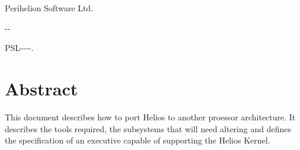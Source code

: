 


\docinfooperator{}
\docinfocomments{}

\markright{\thesubject}

\raggedbottom
\pagestyle{myheadings}



\begin{titlepage}

\begin{center}
\Huge
\thetitle
\vspace{1in}

{\bf\thesubject}
\vspace{1in}

\LARGE
\theauthor

Perihelion Software Ltd.

\theday-\themonth-\theyear

\normalsize
\vspace{2in}
PSL-\theproject-\theauthinit-\theyear-\thedocno.\theversion\\
\end{center}

\end{titlepage}

\pagestyle{plain}

\tableofcontents 
\vfill

\newpage
\section{Abstract}
This document describes how to port Helios to another proessor architecture.
It describes the tools required, the subsystems that will need
altering and defines the specification of an executive capable of
supporting the Helios Kernel.
\newpage

